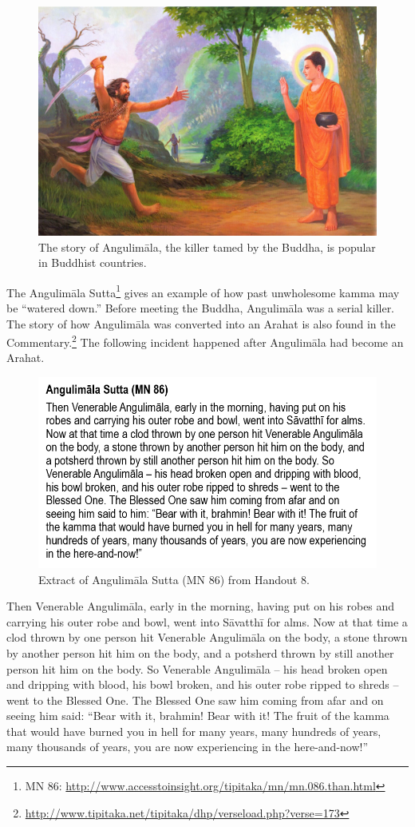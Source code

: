 \begin{figure}[h]
\centering
\includegraphics[width=0.7\linewidth]{./Diagrams/angulimala}
\caption{The story of Angulimāla, the killer tamed by the Buddha, is popular in Buddhist countries.}
\label{fig:angulimala}
\end{figure}

The Angulimāla Sutta\footnote{MN 86: \url{http://www.accesstoinsight.org/tipitaka/mn/mn.086.than.html}} gives an example of how past unwholesome kamma may be “watered down.” Before meeting the Buddha, Angulimāla was a serial killer. The story of how Angulimāla was converted into an Arahat is also found in the Commentary.\footnote{\url{http://www.tipitaka.net/tipitaka/dhp/verseload.php?verse=173}} The following incident happened after Angulimāla had become an Arahat.

\begin{figure}[h]
\centering
\includegraphics[width=0.7\linewidth]{./Diagrams/MN86}
\caption{Extract of Angulimāla Sutta (MN 86) from Handout 8.}
\label{fig:MN86}
\end{figure}

Then Venerable Angulimāla, early in the morning, having put on his robes and carrying his outer robe and bowl, went into Sāvatthī for alms. Now at that time a clod thrown by one person hit Venerable Angulimāla on the body, a stone thrown by another person hit him on the body, and a potsherd thrown by still another person hit him on the body. So Venerable Angulimāla – his head broken open and dripping with blood, his bowl broken, and his outer robe ripped to shreds – went to the Blessed One. The Blessed One saw him coming from afar and on seeing him said: “Bear with it, brahmin! Bear with it! The fruit of the kamma that would have burned you in hell for many years, many hundreds of years, many thousands of years, you are now experiencing in the here-and-now!”

